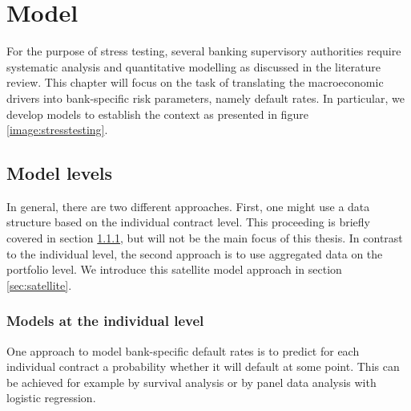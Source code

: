 \documentclass[a4paper, 12pt]{scrreprt}
\begin{document}
\chapter{Model}\label{par:model}

For the purpose of stress testing, several banking supervisory authorities require systematic analysis and quantitative modelling as discussed in the literature review. 
This chapter will focus on the task of translating the macroeconomic drivers into bank-specific risk parameters, namely default rates. In particular, we develop models to establish the context as presented in figure \ref{image:stresstesting}.

\section{Model levels}
In general, there are two different approaches. First, one might use a data structure based on the individual contract level. This proceeding is briefly covered in section \ref{sec:individual}, but will not be the main focus of this thesis. In contrast to the individual level, the second approach is to use aggregated data on the portfolio level. We introduce this satellite model approach in section \ref{sec:satellite}.


\subsection{Models at the individual level}\label{sec:individual}

One approach to model bank-specific default rates is to predict for each individual contract a probability whether it will default at some point. 
This can be achieved for example by survival analysis or by panel data analysis with logistic regression. 

\bigskip 
\end{document}
